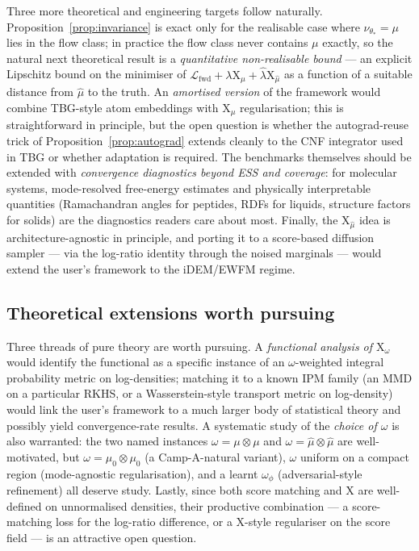 \documentclass[11pt,letterpaper]{article}
\newcommand{\Xfun}{\mathrm{X}}
\theoremstyle{plain}
\begin{document}
Three more theoretical and engineering targets follow naturally.
Proposition~\ref{prop:invariance} is exact only for the realisable case
where $\nu_{\theta_*}=\mu$ lies in the flow class; in practice the flow
class never contains $\mu$ exactly, so the natural next theoretical result
is a \emph{quantitative non-realisable bound} --- an explicit Lipschitz
bound on the minimiser of
$\mathcal L_{\mathrm{fwd}}+\lambda\Xfun_\mu+\hat\lambda\Xfun_{\hat\mu}$
as a function of a suitable distance from $\hat\mu$ to the truth. An
\emph{amortised version} of the framework would combine TBG-style atom
embeddings with $\Xfun_\mu$ regularisation; this is straightforward in
principle, but the open question is whether the autograd-reuse trick of
Proposition~\ref{prop:autograd} extends cleanly to the CNF integrator
used in TBG or whether adaptation is required. The benchmarks themselves
should be extended with \emph{convergence diagnostics beyond ESS and
coverage}: for molecular systems, mode-resolved free-energy estimates and
physically interpretable quantities (Ramachandran angles for peptides,
RDFs for liquids, structure factors for solids) are the diagnostics
readers care about most. Finally, the $\Xfun_{\hat\mu}$ idea is
architecture-agnostic in principle, and porting it to a score-based
diffusion sampler --- via the log-ratio identity through the noised
marginals --- would extend the user's framework to the iDEM/EWFM regime.

\subsection{Theoretical extensions worth pursuing}

Three threads of pure theory are worth pursuing. A \emph{functional analysis
of $\Xfun_\omega$} would identify the functional as a specific instance of
an $\omega$-weighted integral probability metric on log-densities; matching
it to a known IPM family (an MMD on a particular RKHS, or a Wasserstein-style
transport metric on log-density) would link the user's framework to a much
larger body of statistical theory and possibly yield convergence-rate
results. A systematic study of the \emph{choice of $\omega$} is also
warranted: the two named instances $\omega=\mu\otimes\mu$ and
$\omega=\hat\mu\otimes\hat\mu$ are well-motivated, but
$\omega=\mu_0\otimes\mu_0$ (a Camp-A-natural variant), $\omega$ uniform on a
compact region (mode-agnostic regularisation), and a learnt $\omega_\phi$
(adversarial-style refinement) all deserve study. Lastly, since both score
matching and $\Xfun$ are well-defined on unnormalised densities, their
productive combination --- a score-matching loss for the log-ratio
difference, or a $\Xfun$-style regulariser on the score field --- is an
attractive open question.
\end{document}
